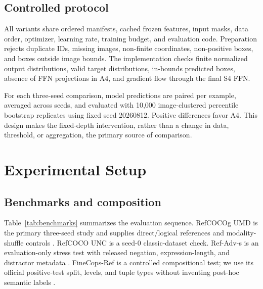 \documentclass[conference]{IEEEtran}
\begin{document}
\subsection{Controlled protocol}
All variants share ordered manifests, cached frozen features, input masks, data order, optimizer, learning rate, training budget, and evaluation code. Preparation rejects duplicate IDs, missing images, non-finite coordinates, non-positive boxes, and boxes outside image bounds. The implementation checks finite normalized output distributions, valid target distributions, in-bounds predicted boxes, absence of FFN projections in A4, and gradient flow through the final S4 FFN.

For each three-seed comparison, model predictions are paired per example, averaged across seeds, and evaluated with 10,000 image-clustered percentile bootstrap replicates using fixed seed 20260812. Positive differences favor A4. This design makes the fixed-depth intervention, rather than a change in data, threshold, or aggregation, the primary source of comparison.

\section{Experimental Setup}
\subsection{Benchmarks and composition}
Table~\ref{tab:benchmarks} summarizes the evaluation sequence. RefCOCOg UMD is the primary three-seed study and supplies direct/logical references and modality-shuffle controls \cite{yu2016context}. RefCOCO UNC is a seed-0 classic-dataset check. Ref-Adv-s is an evaluation-only stress test with released negation, expression-length, and distractor metadata \cite{dong2026refadv}. FineCops-Ref is a controlled compositional test; we use its official positive-test split, levels, and tuple types without inventing post-hoc semantic labels \cite{liu2024finecops}.
\end{document}

